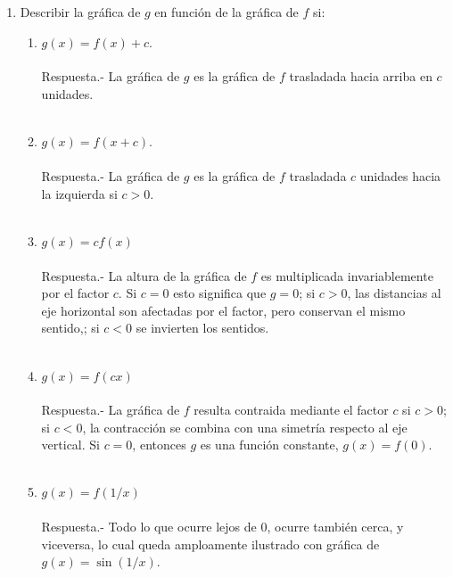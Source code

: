 \begin{enumerate}
\begin{enumerate}[\bfseries (a)]
    \end{enumerate}

    \item Describir la gráfica de $g$ en función de la gráfica de $f$ si:
    \begin{enumerate}[\bfseries (i)]

	\item $g(x)=f(x)+c.$\\\\
	    Respuesta.-\; La gráfica de $g$ es la gráfica de $f$ trasladada hacia arriba en $c$ unidades.\\\\

	\item $g(x)=f(x+c)$.\\\\
	    Respuesta.-\; La gráfica de $g$ es la gráfica de $f$ trasladada $c$ unidades hacia la izquierda si $c>0$.\\\\

	\item $g(x)=cf(x)$\\\\
	    Respuesta.-\; La altura de la gráfica de $f$ es multiplicada invariablemente por el factor $c$. Si $c=0$ esto significa que $g=0$; si $c>0$, las distancias al eje horizontal son afectadas por el factor, pero conservan el mismo sentido,; si $c<0$ se invierten los sentidos.\\\\

	\item $g(x)=f(cx)$\\\\
	    Respuesta.-\; La gráfica de $f$ resulta contraida mediante el factor $c$ si $c>0$; si $c<0$, la contracción se combina con una simetría respecto al eje vertical. Si $c=0$, entonces $g$ es una función constante, $g(x)=f(0)$.\\\\

	\item $g(x)=f(1/x)$\\\\
	    Respuesta.-\; Todo lo que ocurre lejos de $0$, ocurre también cerca, y viceversa, lo cual queda amploamente ilustrado con gráfica de $g(x)=\sin (1/x)$.\\\\


\end{enumerate}
\end{enumerate}
